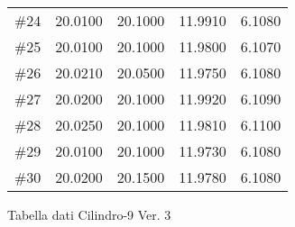 \documentclass[11pt,a4paper,oneside,openany3] {report}
\begin{document}
\begin{table}[ht]
\begin{tabular}{rrrrr}
  \#24 & 20.0100 & 20.1000 & 11.9910 & 6.1080 \\ 
  \#25 & 20.0100 & 20.1000 & 11.9800 & 6.1070 \\ 
  \#26 & 20.0210 & 20.0500 & 11.9750 & 6.1080 \\ 
  \#27 & 20.0200 & 20.1000 & 11.9920 & 6.1090 \\ 
  \#28 & 20.0250 & 20.1000 & 11.9810 & 6.1100 \\ 
  \#29 & 20.0100 & 20.1000 & 11.9730 & 6.1080 \\ 
  \#30 & 20.0200 & 20.1500 & 11.9780 & 6.1080 \\ 
   \hline
\end{tabular}
\end{table}

\newpage

Tabella dati Cilindro-9 Ver. 3
\end{document}
